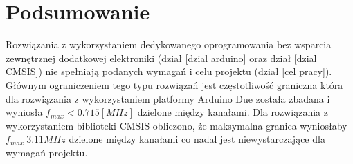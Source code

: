 
\section{Podsumowanie}

Rozwiązania z wykorzystaniem dedykowanego oprogramowania bez wsparcia zewnętrznej dodatkowej elektroniki (dział \ref{dzial arduino} oraz dział \ref{dzial CMSIS}) nie spełniają podanych wymagań i celu projektu (dział \ref{cel pracy}). Głównym ograniczeniem tego typu rozwiązań jest częstotliwość graniczna która dla rozwiązania z wykorzystaniem platformy Arduino Due została zbadana i wyniosła $f_{max}< 0.715 [MHz]$ dzielone między kanałami. Dla rozwiązania z wykorzystaniem biblioteki CMSIS obliczono, że maksymalna granica wyniosłaby $f_{max} ~ 3.11 MHz$ dzielone między kanałami co nadal jest niewystarczające dla wymagań projektu. 

